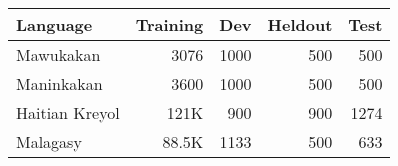 
\begin{tabular}{lrrrr}
\toprule
Language & Training & Dev & Heldout & Test \\
\toprule
Mawukakan & 3076 & 1000 & 500 & 500 \\
Maninkakan & 3600 & 1000 & 500 & 500 \\
Haitian Kreyol & 121K & 900 & 900 & 1274 \\
Malagasy & 88.5K & 1133 & 500 & 633 \\
\bottomrule
\end{tabular}

